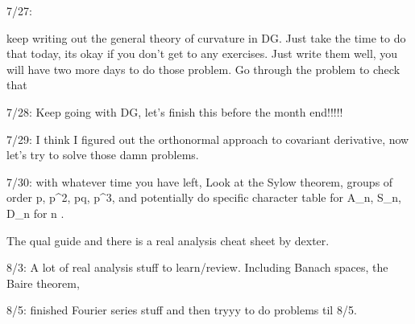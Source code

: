 7/27:

keep writing out the general theory of curvature in DG. Just take the time to do that today, its okay if you don't get to any exercises. Just write them well, you will have two more days to do those problem. Go through the problem to check that 


7/28: Keep going with DG, let's finish this before the month end!!!!!

7/29: I think I figured out the orthonormal approach to covariant derivative, now let's try to solve those damn problems.



7/30: with whatever time you have left, Look at the Sylow theorem, groups of order p, p^2, pq, p^3, and potentially do specific character table for A_n, S_n, D_n for n . 



The qual guide and there is a real analysis cheat sheet by dexter. 

8/3: A lot of real analysis stuff to learn/review. Including Banach spaces, the Baire theorem, 



8/5: finished Fourier series stuff and then tryyy to do problems til 8/5.